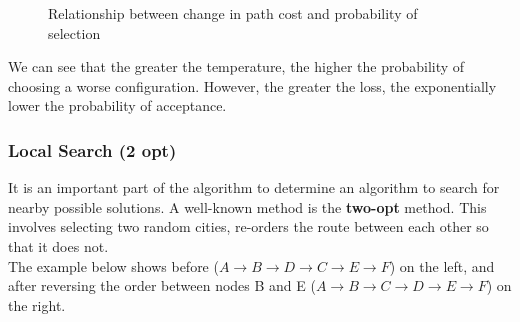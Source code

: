 \documentclass{article}
\begin{document}
\begin{figure}[H]
    \centering
    \caption{Relationship between change in path cost and probability of selection}
\end{figure}

We can see that the greater the temperature, the higher the probability of choosing a worse configuration.
However, the greater the loss, the exponentially lower the probability of acceptance.
\\

\subsubsection{Local Search (2 opt)}

It is an important part of the algorithm to determine an algorithm to search for nearby possible solutions.
A well-known method is the \textbf{two-opt} method.
This involves selecting two random cities, re-orders the route between each other so that it does not.
\\

The example below shows before ($A \rightarrow B \rightarrow D \rightarrow C \rightarrow E \rightarrow F$) on the left, and after reversing the order between nodes B and E ($A \rightarrow B \rightarrow C \rightarrow D \rightarrow E \rightarrow F$) on the right.
\end{document}
